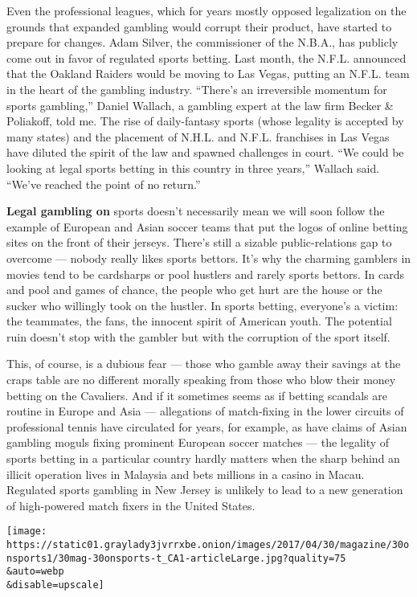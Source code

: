 Even the professional leagues, which for years mostly opposed
legalization on the grounds that expanded gambling would corrupt their
product, have started to prepare for changes. Adam Silver, the
commissioner of the N.B.A., has publicly come out in favor of regulated
sports betting. Last month, the N.F.L. announced that the Oakland
Raiders would be moving to Las Vegas, putting an N.F.L. team in the
heart of the gambling industry. ``There's an irreversible momentum for
sports gambling,'' Daniel Wallach, a gambling expert at the law firm
Becker \& Poliakoff, told me. The rise of daily-fantasy sports (whose
legality is accepted by many states) and the placement of N.H.L. and
N.F.L. franchises in Las Vegas have diluted the spirit of the law and
spawned challenges in court. ``We could be looking at legal sports
betting in this country in three years,'' Wallach said. ``We've reached
the point of no return.''

\textbf{Legal gambling on} sports doesn't necessarily mean we will soon
follow the example of European and Asian soccer teams that put the logos
of online betting sites on the front of their jerseys. There's still a
sizable public-relations gap to overcome --- nobody really likes sports
bettors. It's why the charming gamblers in movies tend to be cardsharps
or pool hustlers and rarely sports bettors. In cards and pool and games
of chance, the people who get hurt are the house or the sucker who
willingly took on the hustler. In sports betting, everyone's a victim:
the teammates, the fans, the innocent spirit of American youth. The
potential ruin doesn't stop with the gambler but with the corruption of
the sport itself.

This, of course, is a dubious fear --- those who gamble away their
savings at the craps table are no different morally speaking from those
who blow their money betting on the Cavaliers. And if it sometimes seems
as if betting scandals are routine in Europe and Asia --- allegations of
match-fixing in the lower circuits of professional tennis have
circulated for years, for example, as have claims of Asian gambling
moguls fixing prominent European soccer matches --- the legality of
sports betting in a particular country hardly matters when the sharp
behind an illicit operation lives in Malaysia and bets millions in a
casino in Macau. Regulated sports gambling in New Jersey is unlikely to
lead to a new generation of high-powered match fixers in the United
States.

\texttt{[image: https://static01.graylady3jvrrxbe.onion/images/2017/04/30/magazine/30onsports1/30mag-30onsports-t\_CA1-articleLarge.jpg?quality=75\\\&auto=webp\\\&disable=upscale]}

